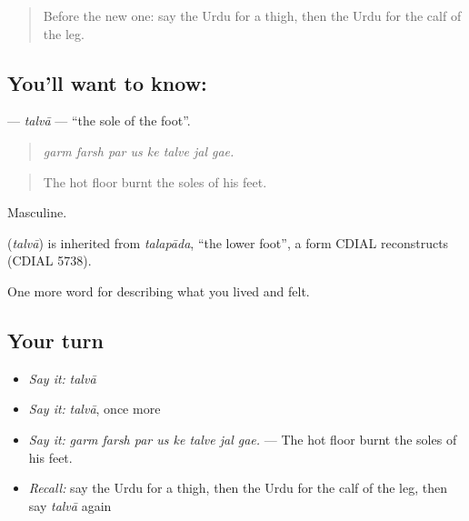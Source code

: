 \label{lesson:UR-C466-talva}



\begin{quote}
Before the new one: say the Urdu for a thigh, then the Urdu for the calf of the leg.
\end{quote}

\subsection*{You'll want to know: }
\textbf{} — \emph{talvā} — \textquotedblleft{}the sole of the foot\textquotedblright{}.

\begin{quote}
       
\end{quote}

\begin{quote}
\emph{garm farsh par us ke talve jal gae.}
\end{quote}

\begin{quote}
The hot floor burnt the soles of his feet.
\end{quote}

Masculine.

\begin{cousinweb}
\textbf{} (\emph{talvā}) is inherited from \emph{talapāda}, \textquotedblleft{}the lower foot\textquotedblright{}, a form CDIAL reconstructs (CDIAL 5738).
\end{cousinweb}

\begin{grammarlens}[title={What you've built}]
One more word for describing what you lived and felt.
\end{grammarlens}

\subsection*{Your turn}
\begin{itemize}
\raggedright
  \item \emph{Say it:} \emph{talvā}
  \item \emph{Say it:} \emph{talvā}, once more
  \item \emph{Say it:} \emph{garm farsh par us ke talve jal gae.} — The hot floor burnt the soles of his feet.
  \item \emph{Recall:} say the Urdu for a thigh, then the Urdu for the calf of the leg, then say \emph{talvā} again
\end{itemize}

